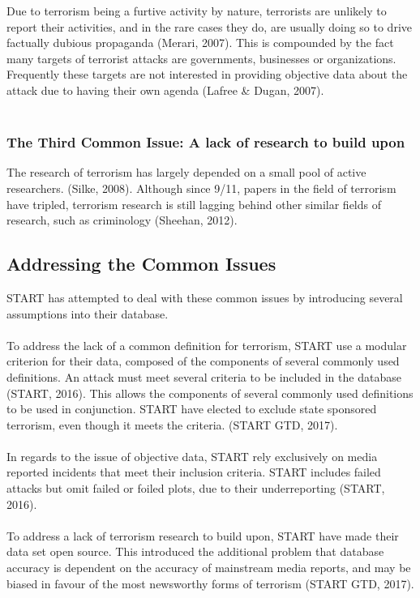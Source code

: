 \documentclass[10pt,a4paper]{article}
\begin{document}
Due to terrorism being a furtive activity by nature, terrorists are unlikely to report their activities, and in the rare cases they do, are usually doing so to drive factually dubious propaganda (Merari, 2007).  This is compounded by the fact many targets of terrorist attacks are governments, businesses or organizations. Frequently these targets are not interested in providing objective data about the attack due to having their own agenda (Lafree \& Dugan, 2007). \\\\


			\subsubsection{The Third Common Issue: A lack of research to build upon}
The research of terrorism has largely depended on a small pool of active researchers. (Silke, 2008). Although since 9/11, papers in the field of terrorism have tripled, terrorism research is still lagging behind other similar fields of research, such as criminology (Sheehan, 2012).

		\subsection{Addressing the Common Issues}
START has attempted to deal with these common issues by introducing several assumptions into their database.\\\\

To address the lack of a common definition for terrorism, START use a modular criterion for their data, composed of the components of several commonly used definitions. An attack must meet several criteria to be included in the database (START, 2016). This allows the components of several commonly used definitions to be used in conjunction.  START have elected to exclude state sponsored terrorism, even though it meets the criteria. (START GTD, 2017).\\\\

In regards to the issue of objective data, START rely exclusively on media reported incidents that meet their inclusion criteria. START includes failed attacks but omit failed or foiled plots, due to their underreporting (START, 2016).  \\\\

To address a lack of terrorism research to build upon, START have made their data set open source. This introduced the additional problem that database accuracy is dependent on the accuracy of mainstream media reports, and may be biased in favour of the most newsworthy forms of terrorism (START GTD, 2017).
\end{document}
